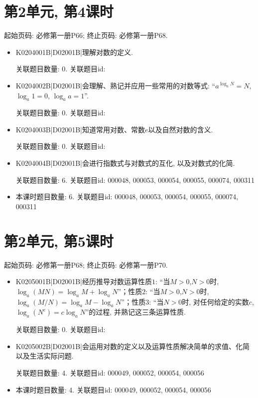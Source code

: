 \section*{第2单元, 第4课时}
起始页码: 必修第一册P66; 终止页码: 必修第一册P68.
\begin{itemize}
\item K0204001B|D02001B|理解对数的定义.

关联题目数量: 0. 关联题目id: 

\item K0204002B|D02001B|会理解、熟记并应用一些常用的对数等式: ``$a^{\log_aN}=N$, $\log_a1=0$, $\log_aa=1$''.

关联题目数量: 0. 关联题目id: 

\item K0204003B|D02001B|知道常用对数、常数$e$以及自然对数的含义.

关联题目数量: 0. 关联题目id: 

\item K0204004B|D02001B|会进行指数式与对数式的互化, 以及对数式的化简.

关联题目数量: 6. 关联题目id: 000048, 000053, 000054, 000055, 000074, 000311

\item 本课时题目数量: 6. 关联题目id: 000048, 000053, 000054, 000055, 000074, 000311

\end{itemize}

\section*{第2单元, 第5课时}
起始页码: 必修第一册P68; 终止页码: 必修第一册P70.
\begin{itemize}
\item K0205001B|D02001B|经历推导对数运算性质$1$: ``当$M>0$,$N>0$时, $\log_a(MN)=\log_aM+\log_aN$''；性质$2$: ``当$M>0$,$N>0$时, $\log_a(M/N)=\log_aM-\log_aN$''；性质$3$: ``当$N>0$时, 对任何给定的实数$c$, $\log_a(N^{c})=c\log_aN$''的过程, 并熟记这三条运算性质.

关联题目数量: 0. 关联题目id: 

\item K0205002B|D02001B|会运用对数的定义以及运算性质解决简单的求值、化简以及生活实际问题.

关联题目数量: 4. 关联题目id: 000049, 000052, 000054, 000056

\item 本课时题目数量: 4. 关联题目id: 000049, 000052, 000054, 000056

\end{itemize}

